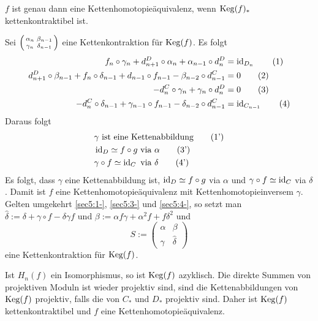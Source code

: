 \begin{lemma}
	$f$ ist genau dann eine Kettenhomotopieäquivalenz, wenn $\operatorname{Keg}(f)_*$ kettenkontraktibel ist.
\end{lemma}
\begin{beweis}
	Sei $\begin{psmallmatrix} \alpha_n & \beta_{n-1} \\ \gamma_n & \delta_{n-1} \end{psmallmatrix}$ eine Kettenkontraktion für $\operatorname{Keg}(f)$. Es folgt 
	\begin{align}
		f_n \circ \gamma_n + d^D_{n+1} \circ \alpha_n + \alpha_{n-1} \circ d_n^D &= \operatorname{id}_{D_n} \tag*{(1)} \\
		d^D_{n+1} \circ \beta_{n-1} + f_n \circ \delta_{n-1} + d_{n-1} \circ f_{n-1} - \beta_{n-2} \circ d_{n-1}^C &= 0 \tag*{(2)}\\
		- d^C_n \circ \gamma_n + \gamma_n \circ d_n^D &= 0 \tag*{(3)} \\
		- d_n^C \circ \delta_{n-1} + \gamma_{n-1} \circ f_{n-1} - \delta_{n-2} \circ d^C_{n-1} &= \operatorname{id}_{C_{n-1}} \tag*{(4)}
	\end{align}
	Daraus folgt
	\begin{align}
		&\gamma \text{ ist eine Kettenabbildung} \tag*{(1')} \label{sec5:1-} \\
		&\operatorname{id}_D \simeq f \circ g \text{ via } \alpha \tag*{(3')} \label{sec5:3-}\\
		& \gamma \circ f \simeq \operatorname{id}_C \text{ via }  \delta \tag*{(4')} \label{sec5:4-}
	\end{align}
	Es folgt, dass $\gamma$ eine Kettenabbildung ist, $\operatorname{id}_D \simeq f \circ g$ via $\alpha$ und $\gamma \circ f \simeq \operatorname{id}_C$ via $\delta$. Damit ist $f$ eine 
	Kettenhomotopieäquivalenz mit Kettenhomotopieinversem $\gamma$. 
	Gelten umgekehrt \ref{sec5:1-}, \ref{sec5:3-} und \ref{sec5:4-}, so setzt man $\hat{\delta} := \delta + \gamma \circ f - \delta \gamma f$ und 
	$\beta := \alpha f \gamma + \alpha^2 f + f \delta^2$ und 
	\[
		S := \begin{pmatrix}
			\alpha & \beta \\
			\gamma & \hat{\delta}
		\end{pmatrix}
	\]
	eine Kettenkontraktion für $\operatorname{Keg}(f)$.
\end{beweis}

\begin{beweis}[name={von \autoref{satz:5:kettenhomotopie} zweite Implikation},label=bew:satz5]
	Ist $H_n(f)$ ein Isomorphismus, so ist $\operatorname{Keg}(f)$ azyklisch. Die direkte Summen von projektiven Moduln ist wieder projektiv sind, sind die Kettenabbildungen von $\operatorname{Keg}(f)$
	projektiv, falls die von $C_*$ und $D_*$ projektiv sind. Daher ist $\operatorname{Keg}(f)$ kettenkontraktibel und $f$ eine Kettenhomotopieäquivalenz.
\end{beweis}

